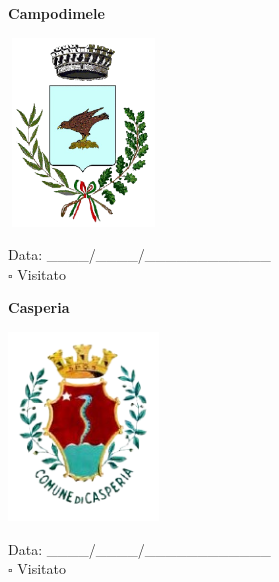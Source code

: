 \documentclass[a5paper,12pt]{article}
\begin{document}
\vspace{0.7cm}

\noindent
\begin{minipage}[t]{0.45\textwidth}
    \begin{center}
        \textbf{Campodimele}
    \end{center}
    \vspace{-0.5cm} %
    \begin{center}
        \includegraphics[height= 5cm, width=4cm]{Lazio/Stemma Campodimele.png}
    \end{center}
    \vspace{-0.4cm} %
    \begin{flushleft}
        Data: \_\_\_\_/\_\_\_\_/\_\_\_\_\_\_\_\_\_\_\_\_ \\
        $\square$ Visitato
    \end{flushleft}
\end{minipage}
\hfill
\noindent
\begin{minipage}[t]{0.45\textwidth}
    \begin{center}
        \textbf{Casperia}
    \end{center}
    \vspace{-0.5cm} %
    \begin{center}
        \includegraphics[height= 5cm, width=4cm]{Lazio/Stemma Casperia.png}
    \end{center}
    \vspace{-0.4cm} %
    \begin{flushleft}
        Data: \_\_\_\_/\_\_\_\_/\_\_\_\_\_\_\_\_\_\_\_\_ \\
        $\square$ Visitato
    \end{flushleft}
\end{minipage}
\end{document}
